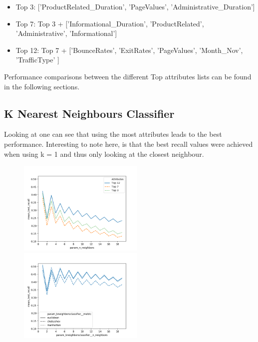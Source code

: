 \begin{itemize}
    \item Top 3: ['ProductRelated\_Duration', 'PageValues', 'Administrative\_Duration']
    \item Top 7: Top 3 + ['Informational\_Duration',  'ProductRelated', 'Administrative', 'Informational']
    \item Top 12: Top 7 +  ['BounceRates', 'ExitRates', 'PageValues', 'Month\_Nov', 'TrafficType' ]
\end{itemize}
Performance comparisons between the different Top attributes lists can be found in the following sections.



\subsection{K Nearest Neighbours Classifier}
Looking at  one can see that using the most attributes leads to the best performance.  Interesting to note here, is that the best recall values were achieved when using k = 1 and thus only looking at the closest neighbour.

\begin{figure}
\begin{floatrow}
    {\includegraphics[width=6cm]{onlineshop/plots/knn_wo_preprocessing.png}\label{fig:knn_wo_pre}}
    {\includegraphics[width=6cm]{onlineshop/plots/knn_uniform_metric_comparison.png}\label{fig:knn_w_pre}}
\end{floatrow}
\end{figure}


